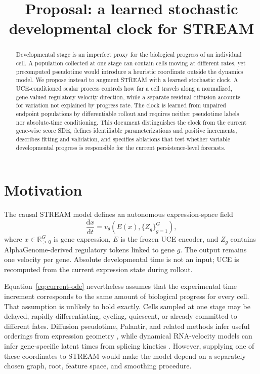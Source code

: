 \documentclass[11pt]{article}
\title{Proposal: a learned stochastic developmental clock for STREAM}
\author{}
\date{}
\newcommand{\stream}{STREAM}
\newcommand{\uce}{UCE}
\newcommand{\R}{\mathbb{R}}
\newcommand{\dd}{\mathrm{d}}
\begin{document}
\maketitle

\begin{abstract}
Developmental stage is an imperfect proxy for the biological progress of an
individual cell. A population collected at one stage can contain cells moving
at different rates, yet precomputed pseudotime would introduce a heuristic
coordinate outside the dynamics model. We propose instead to augment
\stream{} with a learned stochastic clock. A UCE-conditioned scalar process
controls how far a cell travels along a normalized, gene-valued regulatory
velocity direction, while a separate residual diffusion accounts for
variation not explained by progress rate. The clock is learned from unpaired
endpoint populations by differentiable rollout and requires neither
pseudotime labels nor absolute-time conditioning. This document distinguishes
the clock from the current gene-wise score SDE, defines identifiable
parameterizations and positive increments, describes fitting and validation,
and specifies ablations that test whether variable developmental progress is
responsible for the current persistence-level forecasts.
\end{abstract}

\section{Motivation}

The causal \stream{} model defines an autonomous expression-space field
\begin{equation}
  \frac{\dd x}{\dd t}
  = v_\theta\!\left(E(x),\{Z_g\}_{g=1}^{G}\right),
  \label{eq:current-ode}
\end{equation}
where $x\in\R^G_{\geq 0}$ is gene expression, $E$ is the frozen \uce{}
encoder, and $Z_g$ contains AlphaGenome-derived regulatory tokens linked to
gene $g$. The output remains one velocity per gene. Absolute developmental
time is not an input; \uce{} is recomputed from the current expression state
during rollout.

Equation~\ref{eq:current-ode} nevertheless assumes that the experimental time
increment corresponds to the same amount of biological progress for every
cell. That assumption is unlikely to hold exactly. Cells sampled at one stage
may be delayed, rapidly differentiating, cycling, quiescent, or already
committed to different fates. Diffusion pseudotime, Palantir, and related
methods infer useful orderings from expression geometry
\cite{haghverdi2016dpt,setty2019palantir}, while dynamical RNA-velocity models
can infer gene-specific latent times from splicing kinetics
\cite{bergen2020scvelo}. However, supplying one of these coordinates to
\stream{} would make the model depend on a separately chosen graph, root,
feature space, and smoothing procedure.
\end{document}
